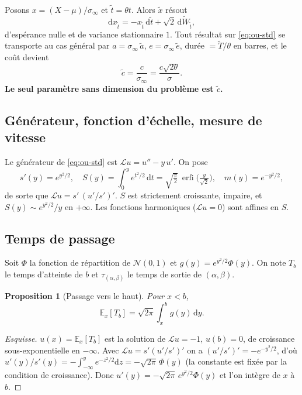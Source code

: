 \documentclass[11pt,a4paper]{article}
\newtheorem{proposition}{Proposition}
\theoremstyle{definition}
\theoremstyle{remark}
\newcommand{\E}{\mathbb{E}}
\newcommand{\dd}{\mathrm{d}}
\newcommand{\sinf}{\sigma_\infty}
\DeclareMathOperator{\erfi}{erfi}
\begin{document}
Posons $x=(X-\mu)/\sinf$ et $\tilde t=\theta t$. Alors $\tilde x$ résout
\begin{equation}\label{eq:ou-std}
\dd x_{\tilde t}=-x_{\tilde t}\,\dd\tilde t+\sqrt2\,\dd\tilde W_{\tilde t},
\end{equation}
d'espérance nulle et de variance stationnaire $1$. Tout résultat sur \eqref{eq:ou-std} se transporte au cas général
par $a=\sinf\,\tilde a$, $e=\sinf\,\tilde e$, durée $=\tilde T/\theta$ en barres, et le coût devient
\begin{equation}\label{eq:ctilde}
\tilde c=\frac{c}{\sinf}=\frac{c\sqrt{2\theta}}{\sigma}.
\end{equation}
\textbf{Le seul paramètre sans dimension du problème est $\tilde c$.}

\subsection{Générateur, fonction d'échelle, mesure de vitesse}

Le générateur de \eqref{eq:ou-std} est $\mathcal L u=u''-y\,u'$. On pose
\begin{equation}\label{eq:echelle}
s'(y)=e^{y^2/2},\quad S(y)=\int_0^y e^{t^2/2}\,\dd t=\sqrt{\tfrac{\pi}{2}}\ \erfi\!\Big(\tfrac{y}{\sqrt2}\Big),\quad
m(y)=e^{-y^2/2},
\end{equation}
de sorte que $\mathcal L u=s'\,(u'/s')'$. $S$ est strictement croissante, impaire, et $S(y)\sim e^{y^2/2}/y$ en $+\infty$.
Les fonctions harmoniques ($\mathcal L u=0$) sont affines en $S$.

\subsection{Temps de passage}

Soit $\Phi$ la fonction de répartition de $\mathcal N(0,1)$ et $g(y)=e^{y^2/2}\Phi(y)$. On note $T_b$ le temps
d'atteinte de $b$ et $\tau_{(\alpha,\beta)}$ le temps de sortie de $(\alpha,\beta)$.

\begin{proposition}[Passage vers le haut]\label{p:fpt}
Pour $x<b$,
\[
\E_x[T_b]=\sqrt{2\pi}\int_x^{b} g(y)\,\dd y .
\]
\end{proposition}
\begin{proof}[Esquisse]
$u(x)=\E_x[T_b]$ est la solution de $\mathcal L u=-1$, $u(b)=0$, de croissance sous-exponentielle en $-\infty$.
Avec $\mathcal L u=s'(u'/s')'$ on a $(u'/s')'=-e^{-y^2/2}$, d'où $u'(y)/s'(y)=-\int_{-\infty}^{y}e^{-z^2/2}\dd z=-\sqrt{2\pi}\,\Phi(y)$
(la constante est fixée par la condition de croissance). Donc $u'(y)=-\sqrt{2\pi}\,e^{y^2/2}\Phi(y)$ et l'on intègre de $x$ à $b$.
\end{proof}
\end{document}
